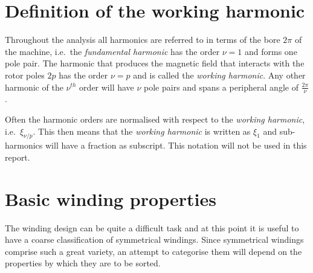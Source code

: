 \section{Definition of the working harmonic}\label{sec:working_harmonic}
Throughout the analysis all harmonics are referred to in terms of the bore $2\pi$ of the machine, i.e.~the \textit{fundamental harmonic} has the order $\nu=1$ and forms one pole pair. The harmonic that produces the magnetic field that interacts with the rotor poles $2p$ has the order $\nu=p$ and is called the \textit{working harmonic}. Any other harmonic of the $\nu^{th}$ order will have $\nu$ pole pairs and spans a peripheral angle of $\frac{2\pi}{\nu}$.

Often the harmonic orders are normalised with respect to the \textit{working harmonic}, i.e.~$\xi_{\nu /p}$. This then means that the \textit{working harmonic} is written as $\xi_1$ and sub-harmonics will have a fraction as subscript. This notation will not be used in this report.

\section{Basic winding properties}%
\label{sec:m_phases}
The winding design can be quite a difficult task and at this point it is useful to have a coarse classification of symmetrical windings. Since symmetrical windings comprise such a great variety, an attempt to categorise them will depend on the properties by which they are to be sorted. 

